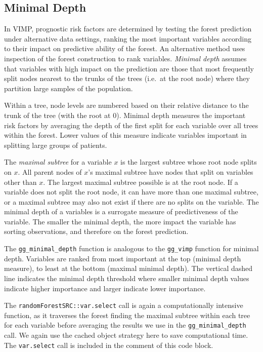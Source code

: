 \documentclass[article]{jss}
\begin{document}
\subsection{Minimal Depth}\label{minimal-depth}

In VIMP, prognostic risk factors are determined by testing the forest
prediction under alternative data settings, ranking the most important
variables according to their impact on predictive ability of the forest.
An alternative method uses inspection of the forest construction to rank
variables. \emph{Minimal depth} assumes that variables with high impact
on the prediction are those that most frequently split nodes nearest to
the trunks of the trees (i.e.~at the root node) where they partition
large samples of the population.

Within a tree, node levels are numbered based on their relative distance
to the trunk of the tree (with the root at 0). Minimal depth measures
the important risk factors by averaging the depth of the first split for
each variable over all trees within the forest. Lower values of this
measure indicate variables important in splitting large groups of
patients.

The \emph{maximal subtree} for a variable \(x\) is the largest subtree
whose root node splits on \(x\). All parent nodes of \(x\)'s maximal
subtree have nodes that split on variables other than \(x\). The largest
maximal subtree possible is at the root node. If a variable does not
split the root node, it can have more than one maximal subtree, or a
maximal subtree may also not exist if there are no splits on the
variable. The minimal depth of a variables is a surrogate measure of
predictiveness of the variable. The smaller the minimal depth, the more
impact the variable has sorting observations, and therefore on the
forest prediction.

The \texttt{gg\_minimal\_depth} function is analogous to the
\texttt{gg\_vimp} function for minimal depth. Variables are ranked from
most important at the top (minimal depth measure), to least at the
bottom (maximal minimal depth). The vertical dashed line indicates the
minimal depth threshold where smaller minimal depth values indicate
higher importance and larger indicate lower importance.

The \texttt{randomForestSRC::var.select} call is again a computationally
intensive function, as it traverses the forest finding the maximal
subtree within each tree for each variable before averaging the results
we use in the \texttt{gg\_minimal\_depth} call. We again use the cached
object strategy here to save computational time. The \texttt{var.select}
call is included in the comment of this code block.
\end{document}
